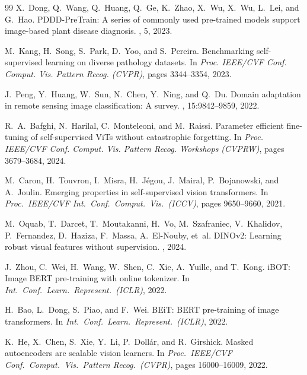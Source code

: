 \documentclass[10pt,twocolumn,letterpaper]{article}
\begin{document}
\begin{thebibliography}{99}
X.~Dong, Q.~Wang, Q.~Huang, Q.~Ge, K.~Zhao, X.~Wu, X.~Wu, L.~Lei,
and G.~Hao.
\newblock PDDD-PreTrain: A series of commonly used pre-trained models support
  image-based plant disease diagnosis.
, 5, 2023.

M.~Kang, H.~Song, S.~Park, D.~Yoo, and S.~Pereira.
\newblock Benchmarking self-supervised learning on diverse pathology datasets.
\newblock In {\em Proc. IEEE/CVF Conf. Comput. Vis. Pattern Recog. (CVPR)},
  pages 3344--3354, 2023.

J.~Peng, Y.~Huang, W.~Sun, N.~Chen, Y.~Ning, and Q.~Du.
\newblock Domain adaptation in remote sensing image classification: A survey.
, 15:9842--9859, 2022.

R.~A.~Bafghi, N.~Harilal, C.~Monteleoni, and M.~Raissi.
\newblock Parameter efficient fine-tuning of self-supervised ViTs without
  catastrophic forgetting.
\newblock In {\em Proc. IEEE/CVF Conf. Comput. Vis. Pattern Recog. Workshops
  (CVPRW)}, pages 3679--3684, 2024.

M.~Caron, H.~Touvron, I.~Misra, H.~J\'egou, J.~Mairal,
P.~Bojanowski, and A.~Joulin.
\newblock Emerging properties in self-supervised vision transformers.
\newblock In {\em Proc.\ IEEE/CVF Int.\ Conf.\ Comput.\ Vis.\ (ICCV)},
  pages 9650--9660, 2021.

M.~Oquab, T.~Darcet, T.~Moutakanni, H.~Vo, M.~Szafraniec,
V.~Khalidov, P.~Fernandez, D.~Haziza, F.~Massa, A.~El-Nouby, et~al.
\newblock DINOv2: Learning robust visual features without supervision.
, 2024.

J.~Zhou, C.~Wei, H.~Wang, W.~Shen, C.~Xie, A.~Yuille,
and T.~Kong.
\newblock iBOT: Image BERT pre-training with online tokenizer.
\newblock In {\em Int.\ Conf.\ Learn.\ Represent.\ (ICLR)}, 2022.

H.~Bao, L.~Dong, S.~Piao, and F.~Wei.
\newblock BEiT: BERT pre-training of image transformers.
\newblock In {\em Int.\ Conf.\ Learn.\ Represent.\ (ICLR)}, 2022.

K.~He, X.~Chen, S.~Xie, Y.~Li, P.~Doll\'ar, and R.~Girshick.
\newblock Masked autoencoders are scalable vision learners.
\newblock In {\em Proc.\ IEEE/CVF Conf.\ Comput.\ Vis.\ Pattern
  Recog.\ (CVPR)}, pages 16000--16009, 2022.


\end{thebibliography}
\end{document}
